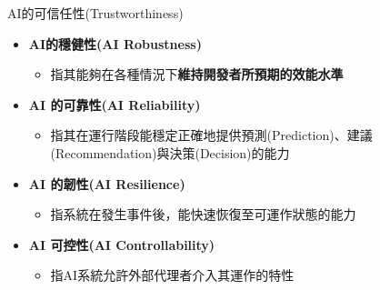 \documentclass[aspectratio=1610]{Common/MyCourseBeamer}
\begin{document}
\begin{frame}[allowframebreaks]{AI的可信任性(Trustworthiness)\cite{ISO22989:2022}}
	\label{AITrustworthiness}
	\begin{itemize}
		\item \textbf{AI的穩健性(AI Robustness)}
		\begin{itemize}
			\item 指其能夠在各種情況下\textbf{維持開發者所預期的效能水準}
		\end{itemize}
		
		\item \textbf{AI 的可靠性(AI Reliability)}
		\begin{itemize}
			
			\item 指其在運行階段能穩定正確地提供預測(Prediction)、建議(Recommendation)與決策(Decision)的能力
			
			
		\end{itemize}
		
		\item \textbf{AI 的韌性(AI Resilience)}
		\begin{itemize}
			\item 指系統在發生事件後，能快速恢復至可運作狀態的能力
			
			
		\end{itemize}
		
		\item \textbf{AI 可控性(AI Controllability)}
		\begin{itemize}
			\item 指AI系統允許外部代理者介入其運作的特性
		\end{itemize}
		

\end{itemize}
\end{frame}
\end{document}
